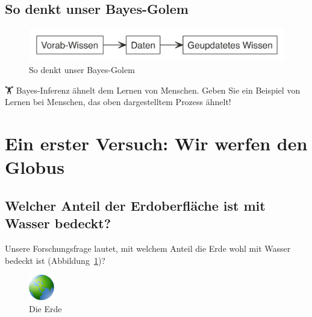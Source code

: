 \documentclass[
  a4paper,
  DIV=11]{scrreprt}
\theoremstyle{definition}
\theoremstyle{remark}
\begin{document}
\hypertarget{so-denkt-unser-bayes-golem}{%
\subsection{So denkt unser
Bayes-Golem}\label{so-denkt-unser-bayes-golem}}

\begin{figure}

{\centering \includegraphics{./img/bayesupdate2.png}

}

\caption{So denkt unser Bayes-Golem}

\end{figure}

🏋 Bayes-Inferenz ähnelt dem Lernen von Menschen. Geben Sie ein Beispiel
von Lernen bei Menschen, das oben dargestelltem Prozess ähnelt!

\hypertarget{ein-erster-versuch-wir-werfen-den-globus}{%
\section{Ein erster Versuch: Wir werfen den
Globus}\label{ein-erster-versuch-wir-werfen-den-globus}}

\hypertarget{welcher-anteil-der-erdoberfluxe4che-ist-mit-wasser-bedeckt}{%
\subsection{Welcher Anteil der Erdoberfläche ist mit Wasser
bedeckt?}\label{welcher-anteil-der-erdoberfluxe4che-ist-mit-wasser-bedeckt}}

Unsere Forschungsfrage lautet, mit welchem Anteil die Erde wohl mit
Wasser bedeckt ist (Abbildung~\ref{fig-erde})?

\begin{figure}

{\centering \includegraphics[width=0.1\textwidth,height=\textheight]{./img/earth.png}

}

\caption{\label{fig-erde}Die Erde}

\end{figure}
\end{document}
